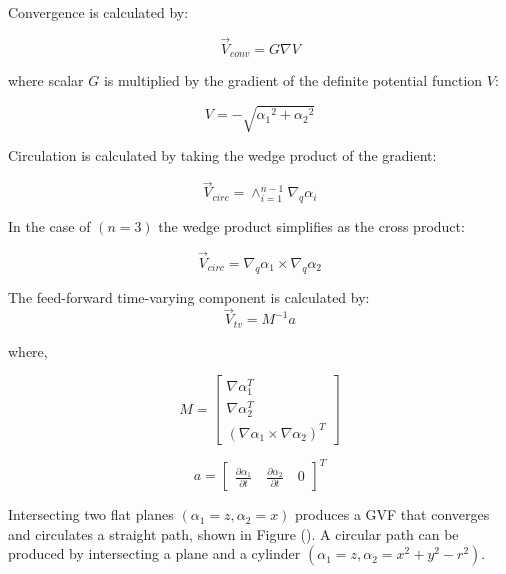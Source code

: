 \documentclass[conf]{new-aiaa}
\begin{document}
Convergence is calculated by:

\begin{equation}
\vec{V}_{conv} = G \nabla V  
\label{convOnly}
\end{equation}

where scalar $G$ is multiplied by the gradient of the definite potential function $V$:

\begin{equation}
V = -\sqrt{{\alpha_1}^2 + {\alpha_2}^2}
\end{equation}



Circulation is calculated by taking the wedge product of the gradient:

\begin{equation}
\vec{V}_{circ} =  \wedge_{i=1}^{n-1}\nabla_q\alpha_i 
\label{circOnly}
\end{equation}

In the case of $(n=3)$ the wedge product simplifies as the cross product:

\begin{equation}
\vec{V}_{circ} =  \nabla_q\alpha_1 \times \nabla_q\alpha_2 
\label{circOnlySimp}
\end{equation}

The feed-forward time-varying component is calculated by:
\begin{equation}
\label{tv}
\vec{V}_{tv} = M^{-1}a
\end{equation}

where,

\begin{equation}
\label{mMatrix}
M =\begin{bmatrix}
\nabla\alpha_1^T \\
\nabla\alpha_2^T \\
(\nabla\alpha_1 \times \nabla\alpha_2)^T
\end{bmatrix}
\end{equation}

\begin{equation}
\label{aVector}
a =\begin{bmatrix}
\frac{\partial \alpha_1}{\partial t} \quad   \frac{\partial \alpha_2}{\partial t} \quad   0
\end{bmatrix}^T
\end{equation}

Intersecting two flat planes $(\alpha_1 = z,\alpha_2 = x)$ produces a GVF that converges and circulates a straight path, shown in Figure (). A circular path can be produced by intersecting a plane and a cylinder $(\alpha_1 = z,\alpha_2 = x^2+y^2-r^2)$.
\end{document}

